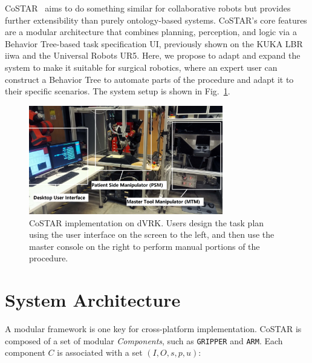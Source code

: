 \documentclass[letterpaper, 10 pt, conference]{ieeeconf}
\begin{document}


CoSTAR~\cite{paxton2017costar} aims to do something similar for collaborative robots but provides further extensibility than purely ontology-based systems.
CoSTAR's core features are a modular architecture that combines planning, perception, and logic via a Behavior Tree-based task specification UI, previously shown on the KUKA LBR iiwa and the Universal Robots UR5. Here, we propose to adapt and expand the system to make it suitable for surgical robotics, where an expert user can construct a Behavior Tree to automate parts of the procedure and adapt it to their specific scenarios.
The system setup is shown in Fig.~\ref{fig:dvrk}. 

\begin{figure}[bt]
\centering
\includegraphics[width=240pt]{dvrk.png}
\caption{CoSTAR implementation on dVRK. Users design the task plan using the user interface on the screen to the left, and then use the master console on the right to perform manual portions of the procedure.}
\label{fig:dvrk}
\end{figure}


\section{System Architecture}
A modular framework is one key for cross-platform implementation. CoSTAR is composed of a set of modular \textit{Components}, such as \texttt{GRIPPER} and \texttt{ARM}. Each component $C$ is associated with a set $(I,O,s,p,u)$: 
\end{document}
